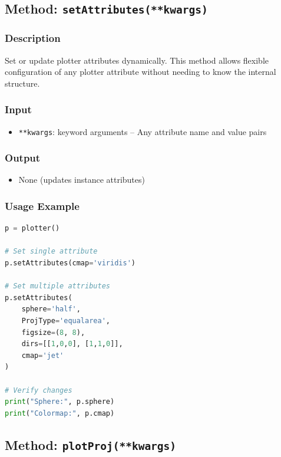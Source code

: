 \documentclass[11pt,a4paper]{article}
\begin{document}
\subsection{Method: \texttt{setAttributes(**kwargs)}}

\subsubsection{Description}
Set or update plotter attributes dynamically. This method allows flexible configuration of any plotter attribute without needing to know the internal structure.

\subsubsection{Input}
\begin{itemize}[leftmargin=*]
    \item \texttt{**kwargs}: keyword arguments -- Any attribute name and value pairs
\end{itemize}

\subsubsection{Output}
\begin{itemize}[leftmargin=*]
    \item None (updates instance attributes)
\end{itemize}

\subsubsection{Usage Example}
\begin{lstlisting}[language=Python, caption=Setting attributes]
p = plotter()

# Set single attribute
p.setAttributes(cmap='viridis')

# Set multiple attributes
p.setAttributes(
    sphere='half',
    ProjType='equalarea',
    figsize=(8, 8),
    dirs=[[1,0,0], [1,1,0]],
    cmap='jet'
)

# Verify changes
print("Sphere:", p.sphere)
print("Colormap:", p.cmap)
\end{lstlisting}

\subsection{Method: \texttt{plotProj(**kwargs)}}
\end{document}
